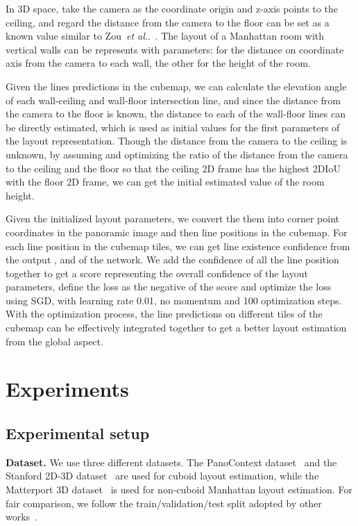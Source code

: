 \documentclass[runningheads]{llncs}
\makeatletter
\DeclareRobustCommand\onedot{\futurelet\@let@token\@onedot}
\def\@onedot{\ifx\@let@token.\else.\null\fi\xspace}
\def\etal{\emph{et al}\onedot}
\makeatother
\begin{document}
In 3D space, take the camera as the coordinate origin and z-axis points to the ceiling, and regard the distance from the camera to the floor can be set as a known value similar to Zou~\etal~\cite{zou2018layoutnet}. The layout of a Manhattan room with  vertical walls can be represents with  parameters:  for the distance on coordinate axis from the camera to each wall, the other for the height of the room. 

Given the lines predictions in the cubemap, we can calculate the elevation angle of each wall-ceiling and wall-floor intersection line, and since the distance from the camera to the floor is known, the distance to each of the wall-floor lines can be directly estimated, which is used as initial values for the first  parameters of the layout representation. Though the distance from the camera to the ceiling is unknown, by assuming and optimizing the ratio of the distance from the camera to the ceiling and the floor so that the ceiling 2D frame has the highest 2DIoU with the floor 2D frame, we can get the initial estimated value of the room height. 

Given the initialized layout parameters, we convert the them into corner point coordinates in the panoramic image and then line positions in the cubemap. For each line position in the cubemap tiles, we can get line existence confidence from the output ,  and  of the network. We add the confidence of all the line position together to get a score representing the overall confidence of the layout parameters, define the loss as the negative of the score and optimize the loss using SGD, with learning rate 0.01, no momentum and 100 optimization steps. With the optimization process, the line predictions on different tiles of the cubemap can be effectively integrated together to get a better layout estimation from the global aspect. \section{Experiments}
\subsection{Experimental setup}
\noindent\textbf{Dataset.} We use three different datasets. The PanoContext dataset~\cite{zhang2014panocontext} and the Stanford 2D-3D dataset~\cite{armeni2017joint,zou2018layoutnet} are used for cuboid layout estimation, while the Matterport 3D dataset~\cite{Matterport3D} is used for non-cuboid Manhattan layout estimation. For fair comparison, we follow the train/validation/test split adopted by other works~\cite{zou2018layoutnet,sun2019horizonnet,zou2021_layoutv2}.
\end{document}
